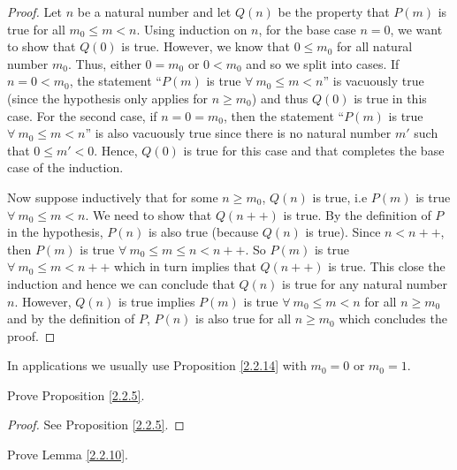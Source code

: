 \begin{proof}
    Let \(n\) be a natural number and let \(Q(n)\) be the property that \(P(m)\) is true for all \(m_0 \leq m < n\).
    Using induction on \(n\), for the base case \(n = 0\), we want to show that \(Q(0)\) is true.
    However, we know that \(0 \leq m_0\) for all natural number \(m_0\).
    Thus, either \(0 = m_0\) or \(0 < m_0\) and so we split into cases.
    If \(n = 0 < m_0\), the statement ``\(P(m)\) is true \(\forall\ m_0 \leq m < n\)'' is vacuously true (since the hypothesis only applies for \(n \geq m_0\)) and thus \(Q(0)\) is true in this case.
    For the second case, if \(n = 0 = m_0\), then the statement ``\(P(m)\) is true \(\forall\ m_0 \leq m < n\)'' is also vacuously true since there is no natural number \(m'\) such that \(0 \leq m' < 0\). Hence, \(Q(0)\) is true for this case and that completes the base case of the induction.

    Now suppose inductively that for some \(n \geq m_0\), \(Q(n)\) is true, i.e \(P(m)\) is true \(\forall\ m_0 \leq m < n\).
    We need to show that \(Q(n++)\) is true.
    By the definition of \(P\) in the hypothesis, \(P(n)\) is also true (because \(Q(n)\) is true).
    Since \(n < n++\), then \(P(m)\) is true \(\forall\ m_0 \leq m \leq n < n++\).
    So \(P(m)\) is true \(\forall\ m_0 \leq m < n++\) which in turn implies that \(Q(n++)\) is true.
    This close the induction and hence we can conclude that \(Q(n)\) is true for any natural number \(n\).
    However, \(Q(n)\) is true implies \(P(m)\) is true \(\forall\ m_0 \leq m < n\) for all \(n \geq m_0\) and by the definition of \(P\), \(P(n)\) is also true for all \(n \geq m_0\) which concludes the proof.
\end{proof}

\begin{remark}\label{2.2.15}
    In applications we usually use Proposition \ref{2.2.14} with \(m_0 = 0\) or \(m_0 = 1\).
\end{remark}

\exercisesection

\begin{exercise}\label{ex 2.2.1}
    Prove Proposition \ref{2.2.5}.
\end{exercise}

\begin{proof}
    See Proposition \ref{2.2.5}.
\end{proof}

\begin{exercise}\label{ex 2.2.2}
    Prove Lemma \ref{2.2.10}.
\end{exercise}

